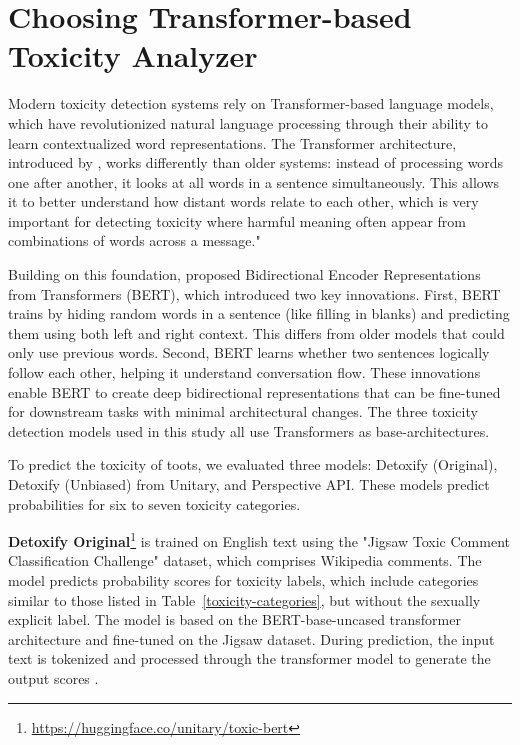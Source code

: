\chapter{Choosing Transformer-based Toxicity Analyzer} \label{choosing-toxicity-analyzer}
Modern toxicity detection systems rely on Transformer-based language models, which have revolutionized natural language processing through their ability to learn contextualized word representations. The Transformer architecture, introduced by \citet{vaswani:2017}, works differently than older systems: instead of processing words one after another, it looks at all words in a sentence simultaneously. This allows it to better understand how distant words relate to each other, which is very important for detecting toxicity where harmful meaning often appear from combinations of words across a message."

Building on this foundation, \citet{devlin:2019} proposed Bidirectional Encoder Representations from Transformers (BERT), which introduced two key innovations. First, BERT trains by hiding random words in a sentence (like filling in blanks) and predicting them using both left and right context. This differs from older models that could only use previous words. Second, BERT learns whether two sentences logically follow each other, helping it understand conversation flow. These innovations enable BERT to create deep bidirectional representations that can be fine-tuned for downstream tasks with minimal architectural changes. The three toxicity detection models used in this study all use Transformers as base-architectures.

To predict the toxicity of toots, we evaluated three models: Detoxify (Original), Detoxify (Unbiased) from Unitary, and Perspective API. These models predict probabilities for six to seven toxicity categories.

\textbf{Detoxify Original}\footnote{\url{https://huggingface.co/unitary/toxic-bert}} is trained on English text using the "Jigsaw Toxic Comment Classification Challenge" dataset, which comprises Wikipedia comments. The model predicts probability scores for toxicity labels, which include categories similar to those listed in Table~\ref{toxicity-categories}, but without the sexually explicit label. The model is based on the BERT-base-uncased transformer architecture and fine-tuned on the Jigsaw dataset. During prediction, the input text is tokenized and processed through the transformer model to generate the output scores \cite{detoxify:medium}.

